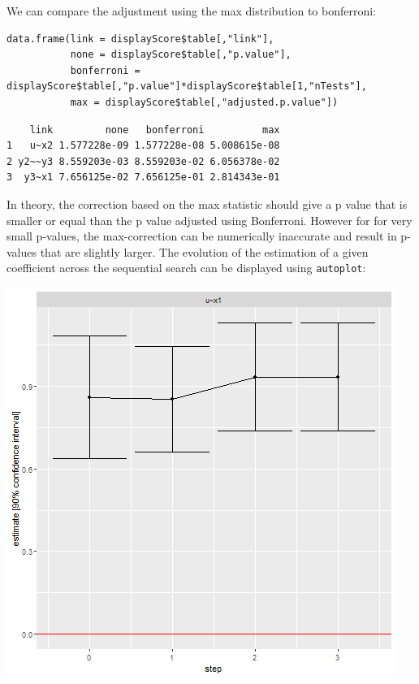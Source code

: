 \documentclass[12pt]{article}
\begin{document}
We can compare the adjustment using the max distribution to bonferroni:
\lstset{language=r,label= ,caption= ,captionpos=b,numbers=none}
\begin{lstlisting}
data.frame(link = displayScore$table[,"link"],
           none = displayScore$table[,"p.value"],
           bonferroni = displayScore$table[,"p.value"]*displayScore$table[1,"nTests"],
           max = displayScore$table[,"adjusted.p.value"])
\end{lstlisting}

\begin{verbatim}
    link         none   bonferroni          max
1   u~x2 1.577228e-09 1.577228e-08 5.008615e-08
2 y2~~y3 8.559203e-03 8.559203e-02 6.056378e-02
3  y3~x1 7.656125e-02 7.656125e-01 2.814343e-01
\end{verbatim}


In theory, the correction based on the max statistic should give a p
value that is smaller or equal than the p value adjusted using
Bonferroni. However for for very small p-values, the max-correction
can be numerically inaccurate and result in p-values that are slightly
larger. The evolution of the estimation of a given coefficient across
the sequential search can be displayed using \texttt{autoplot}:

\begin{center}
\includegraphics[width=.9\linewidth]{./modelsearch.png}
\end{center}
\end{document}
